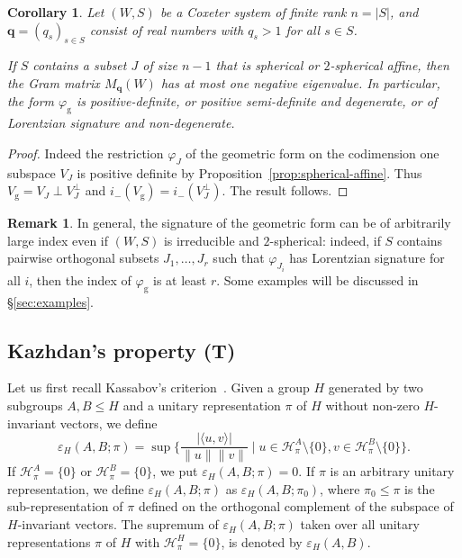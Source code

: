\documentclass[12pt,a4paper]{amsproc}
\newtheorem{corollary}[theorem]{Corollary}
\theoremstyle{definition}
\newtheorem{remark}[theorem]{Remark}
\newcommand{\qq}{\mathbf q}
\newcommand{\rg}{\mathrm g}
\begin{document}
\begin{corollary}\label{cor:lorentzian-dichotomy}
Let $(W, S)$ be a Coxeter system of finite rank $n = |S|$, and $\qq= (q_s)_{s \in S}$ consist of real numbers with $q_s > 1$ for all $s \in S$.

If $S$ contains a subset $J$ of size $n-1$ that is spherical or $2$-spherical affine, then  the Gram matrix $M_\qq(W)$ has at most one negative eigenvalue. In particular, the form $\varphi_\rg$ is positive-definite, or positive semi-definite and degenerate, or of Lorentzian signature and non-degenerate. 
\end{corollary}
\begin{proof}
Indeed the restriction $\varphi_J$ of the geometric form on the codimension one subspace $V_J$ is positive definite by Proposition~\ref{prop:spherical-affine}. Thus $V_\rg = V_J \perp V_J^\perp$ and $i_-(V_\rg) = i_-(V_J^\perp)$. The result follows. 
\end{proof}

\begin{remark}
In general, the signature of the geometric form can be of arbitrarily large   index even if $(W, S)$ is irreducible and $2$-spherical: indeed, if $S$ contains pairwise orthogonal subsets $J_1, \dots, J_r$ such that $\varphi_{J_i}$ has Lorentzian signature for all $i$, then the   index of $\varphi_\rg$ is at least $r$. Some examples will be discussed in \S\ref{sec:examples}. 
\end{remark}

 	
	

\subsection{Kazhdan's property (T)}

Let us first recall Kassabov's criterion~\cite{Ka11}. 
Given a group $H$ generated by two subgroups $A, B \leq H$ 
 and a unitary representation $\pi$ of $H$ without non-zero $H$-invariant vectors, we define
$$\varepsilon_H(A, B; \pi) = \sup\big\{\frac{|\langle u, v \rangle |}{\| u \| \| v \|} \mid u \in \mathcal H_\pi^A \setminus \{0\}, v \in \mathcal H_\pi^B \setminus \{0\}\big\}.
$$
 If $\mathcal H_\pi^A = \{0\}$ or $\mathcal H_\pi^B = \{0\}$, we put $\varepsilon_H(A, B; \pi) =0$. If $\pi$ is an arbitrary unitary representation, we define  $\varepsilon_H(A, B; \pi)$ as $\varepsilon_H(A, B;\pi_0)$, where $\pi_0 \leq \pi$ is the sub-representation of $\pi$ defined on the orthogonal complement of the subspace of $H$-invariant vectors. 
The supremum of $\varepsilon_H(A, B; \pi) $ taken over all unitary representations $\pi$ of $H$ with $\mathcal H_\pi^H = \{0\}$, is denoted by 
$\varepsilon_H(A, B).$
\end{document}
